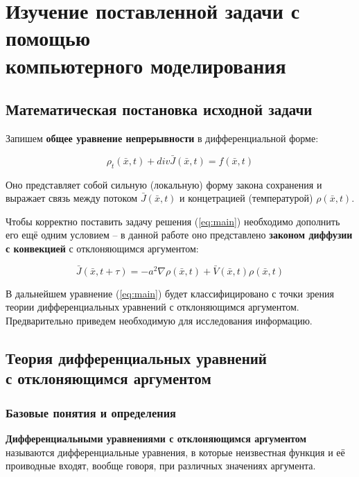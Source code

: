 \section{Изучение поставленной задачи с помощью\\компьютерного моделирования}

\subsection{Математическая постановка исходной задачи}

Запишем \textbf{общее уравнение непрерывности} в дифференциальной форме:

\begin{equation}\label{eq:main}
\rho_t(\bar{x},t) + div \bar{J}(\bar{x},t) = f(\bar{x},t)
\end{equation}

Оно представляет собой сильную (локальную) форму закона сохранения и выражает связь между потоком $\bar{J} (\bar{x},t)$ и концетрацией (температурой) $\rho(\bar{x},t)$.

Чтобы корректно поставить задачу решения (\ref{eq:main}) необходимо дополнить его ещё одним условием \--- в данной работе оно представлено \textbf{законом диффузии с конвекцией} с отклоняющимся аргументом:

\begin{equation}\label{eq:diffusion-convection}
\bar{J}(\bar{x},t+\tau) = -a^2 \nabla \rho(\bar{x},t) + \bar{V}(\bar{x},t) \rho(\bar{x},t)
\end{equation}

В дальнейшем уравнение (\ref{eq:main}) будет классифицировано с точки зрения теории дифференциальных уравнений с отклоняющимся аргументом. Предварительно приведем необходимую для исследования информацию.

\subsection{Теория дифференциальных уравнений\\с отклоняющимся аргументом}

\subsubsection{Базовые понятия и определения}

\textbf{Дифференциальными уравнениями с отклоняющимся аргументом} называются дифференциальные уравнения, в которые неизвестная функция и её проиводные входят, вообще говоря, при различных значениях аргумента.

